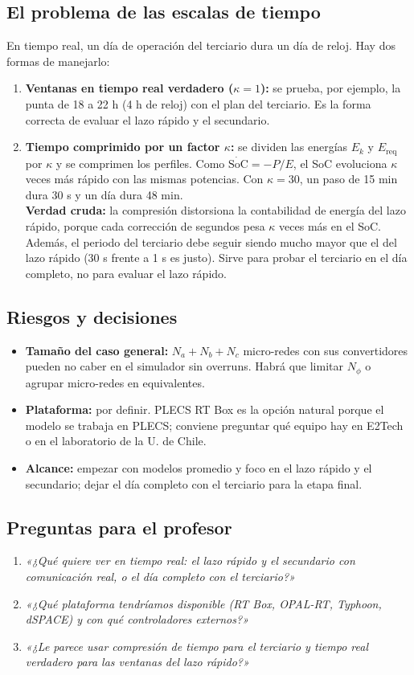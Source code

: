 \documentclass[10pt,a4paper]{article}
\newcommand{\SoC}{\mathrm{SoC}}
\begin{document}
\subsection*{El problema de las escalas de tiempo}
En tiempo real, un día de operación del terciario dura un día de reloj. Hay dos formas de manejarlo:
\begin{enumerate}
  \item \textbf{Ventanas en tiempo real verdadero ($\kappa=1$):} se prueba, por ejemplo, la punta de 18 a 22 h (4 h de reloj) con el plan del terciario. Es la forma correcta de evaluar el lazo rápido y el secundario.
  \item \textbf{Tiempo comprimido por un factor $\kappa$:} se dividen las energías $E_k$ y $E_{\mathrm{req}}$ por $\kappa$ y se comprimen los perfiles. Como $\dot{\SoC}=-P/E$, el SoC evoluciona $\kappa$ veces más rápido con las mismas potencias. Con $\kappa=30$, un paso de 15 min dura 30 s y un día dura 48 min.\\
  \textbf{Verdad cruda:} la compresión distorsiona la contabilidad de energía del lazo rápido, porque cada corrección de segundos pesa $\kappa$ veces más en el SoC. Además, el periodo del terciario debe seguir siendo mucho mayor que el del lazo rápido (30 s frente a 1 s es justo). Sirve para probar el terciario en el día completo, no para evaluar el lazo rápido.
\end{enumerate}

\subsection*{Riesgos y decisiones}
\begin{itemize}
  \item \textbf{Tamaño del caso general:} $N_a+N_b+N_c$ micro-redes con sus convertidores pueden no caber en el simulador sin overruns. Habrá que limitar $N_\phi$ o agrupar micro-redes en equivalentes.
  \item \textbf{Plataforma:} por definir. PLECS RT Box es la opción natural porque el modelo se trabaja en PLECS; conviene preguntar qué equipo hay en E2Tech o en el laboratorio de la U. de Chile.
  \item \textbf{Alcance:} empezar con modelos promedio y foco en el lazo rápido y el secundario; dejar el día completo con el terciario para la etapa final.
\end{itemize}

\subsection*{Preguntas para el profesor}
\begin{enumerate}
  \item \emph{«¿Qué quiere ver en tiempo real: el lazo rápido y el secundario con comunicación real, o el día completo con el terciario?»}
  \item \emph{«¿Qué plataforma tendríamos disponible (RT Box, OPAL-RT, Typhoon, dSPACE) y con qué controladores externos?»}
  \item \emph{«¿Le parece usar compresión de tiempo para el terciario y tiempo real verdadero para las ventanas del lazo rápido?»}
\end{enumerate}
\end{document}
